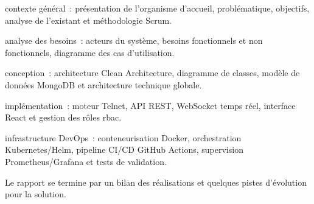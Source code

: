 \begin{description}[labelwidth=3.5cm,leftmargin=4cm]
  \item[\textbf{Chapitre 1}] contexte général~: présentation de l'organisme
    d'accueil, problématique, objectifs, analyse de l'existant et
    méthodologie Scrum.

  \item[\textbf{Chapitre 2}] analyse des besoins~: acteurs du système,
    besoins fonctionnels et non fonctionnels, diagramme des cas
    d'utilisation.

  \item[\textbf{Chapitre 3}] conception~: architecture Clean Architecture,
    diagramme de classes, modèle de données MongoDB et architecture
    technique globale.

  \item[\textbf{Chapitre 4}] implémentation~: moteur Telnet, API REST,
    WebSocket temps réel, interface React et gestion des rôles \gls{rbac}.

  \item[\textbf{Chapitre 5}] infrastructure DevOps~: conteneurisation
    Docker, orchestration Kubernetes/Helm, pipeline CI/CD GitHub Actions,
    supervision Prometheus/Grafana et tests de validation.
\end{description}

\noindent Le rapport se termine par un bilan des réalisations et quelques
pistes d'évolution pour la solution.
